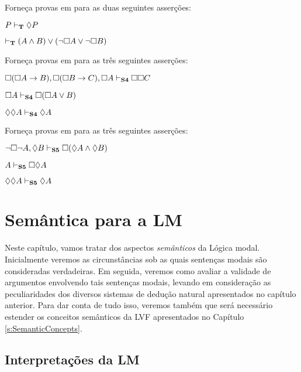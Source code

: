 \problempart
Forneça provas em  \mlT{} para as duas seguintes asserções:
\begin{earg}
	\item $P\vdash_{\mathbf{T}}\Diamond P$
	\item $\vdash_{\mathbf{T}} (A\wedge B)\vee(\neg \Box A\vee\neg\Box B)$
\end{earg}

\problempart
Forneça provas em  \mlSfour{}  para as três seguintes asserções:
\begin{earg}
	\item $\Box(\Box A\rightarrow B), \Box (\Box B\rightarrow C), \Box A \vdash_{\mathbf{S4}} \Box\Box C$
	\item $\Box A \vdash_{\mathbf{S4}} \Box(\Box A \vee B)$
	\item $\Diamond \Diamond A \vdash_{\mathbf{S4}} \Diamond A$
\end{earg}

\problempart
Forneça provas em \mlSfive{} para as três seguintes asserções:
\begin{earg}
	\item $\neg\Box\neg A, \Diamond B\vdash_{\mathbf{S5}} \Box(\Diamond A \wedge \Diamond B)$
	\item $A \vdash_{\mathbf{S5}}  \Box\Diamond A$
	\item $\Diamond\Diamond A\vdash_{\mathbf{S5}}  \Diamond A$
\end{earg}

\chapter{Semântica para  a  LM}
\label{Semantics}

Neste capítulo, vamos tratar dos aspectos \emph{semânticos} da Lógica modal.  Inicialmente veremos as circunstâncias sob as quais sentenças modais são consideradas verdadeiras. Em seguida, veremos como avaliar a validade de argumentos envolvendo tais sentenças modais, levando em consideração as peculiaridades dos diversos sistemas  de  dedução natural  apresentados no capítulo anterior. Para dar conta de tudo isso, veremos também  que será necessário  estender os conceitos semânticos da LVF apresentados no Capítulo \ref{s:SemanticConcepts}. 

\section{Interpretações da LM}

